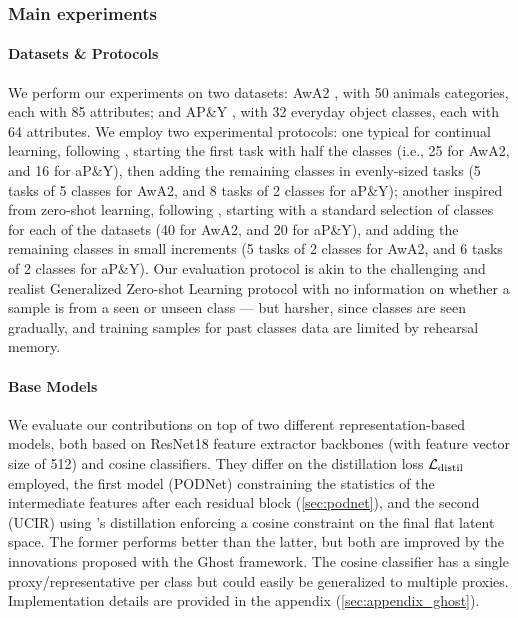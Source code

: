 \subsubsection{Main experiments}
\label{sec:ghost_quantitative}

\paragraph{Datasets \& Protocols} We perform our experiments on two datasets: AwA2
\citet{xian2019awa2}, with 50 animals categories, each with 85 attributes; and AP\&Y
\citet{farhadi2009apy}, with 32 everyday object classes, each with 64 attributes. We employ two
experimental protocols: one typical for continual learning, following
\citet{hou2019ucir,douillard2020podnet}, starting the first task with half the classes (i.e., 25 for
AwA2, and 16 for aP\&Y), then adding the remaining classes in evenly-sized tasks (5 tasks of 5
classes for AwA2, and 8 tasks of 2 classes for aP\&Y); another inspired from zero-shot learning,
following \citet{xian2019awa2}, starting with a standard selection of classes for each of the
datasets (40 for AwA2, and 20 for aP\&Y), and adding the remaining classes in small increments (5
tasks of 2 classes for AwA2, and 6 tasks of 2 classes for aP\&Y). Our evaluation protocol is akin to
the challenging and realist Generalized Zero-shot Learning \citep{scheirer2013generalizedzeroshot,
    chao2016generalizedzeroshot} protocol with no information on whether a sample is from a seen or
unseen class — but harsher, since classes are seen gradually, and training samples for past classes
data are limited by rehearsal memory.

\paragraph{Base Models} We evaluate our contributions on top of two different representation-based
models, both based on ResNet18 \citep{he2016resnet} feature extractor backbones (with feature vector
size of 512) and cosine classifiers. They differ on the distillation loss $\mathcal{L}_\text{distil}$
employed, the first model (PODNet) constraining the statistics of the intermediate features after
each residual block (\autoref{sec:podnet}), and the second (UCIR) using \citet{hou2019ucir}'s
distillation enforcing a cosine constraint on the final flat latent space. The former performs
better than the latter, but both are improved by the innovations proposed with the Ghost framework.
The cosine classifier has a single proxy/representative per class but could easily be generalized to
multiple proxies. Implementation details are provided in the appendix
(\autoref{sec:appendix_ghost}).

